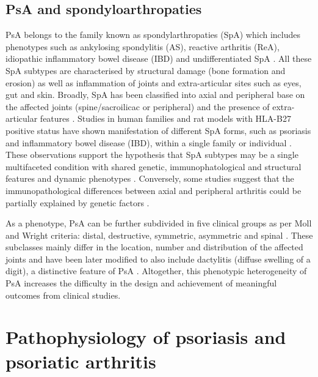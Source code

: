 \subsection{PsA and spondyloarthropaties}
%
PsA belongs to the family known as spondylarthropaties (SpA) which includes phenotypes such as ankylosing spondylitis (AS), reactive arthritis (ReA), idiopathic inflammatory bowel disease (IBD) and undifferentiated SpA \parencite{Baeten2013}. All these SpA subtypes are characterised by structural damage (bone formation and erosion) as well as inflammation of joints and extra-articular sites such as eyes, gut and skin. Broadly, SpA has been classified into axial and peripheral base on the affected joints (spine/sacroilicac or peripheral) and the presence of extra-articular features \parencite{Runwaleit2001, Runwaleit2001}. Studies in human families and rat models with HLA-B27 positive status have shown manifestation of different SpA forms, such as psoriasis and inflammatory bowel disease (IBD), within a single family or individual \parencite{Hammer1990,Said-Nahal2000}. These observations support the hypothesis that SpA subtypes may be a single multifaceted condition with shared genetic, immunophatological and structural features and dynamic phenotypes \parencite{Baeten2013}. Conversely, some studies suggest that the immunopathological differences between axial and peripheral arthritis could be partially explained by genetic factors \parencite{Porcher2005, Appel2011, Noordenbos2012}.

As a phenotype, PsA can be further subdivided in five clinical groups as per Moll and Wright criteria: distal, destructive, symmetric, asymmetric and spinal \parencite{Moll1973}. These subclasses mainly differ in the location, number and distribution of the affected joints and have been later modified to also include dactylitis (diffuse swelling of a digit), a distinctive feature of PsA \parencite{Reich2009}. Altogether, this phenotypic heterogeneity of PsA increases the difficulty in the design and achievement of meaningful outcomes from clinical studies.




\section{Pathophysiology of psoriasis and psoriatic arthritis}

